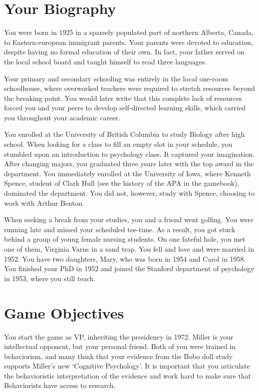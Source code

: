 \begin{refsection}
\section{Your Biography}
\label{yourbiography}

You were born in 1925 in a sparsely populated part of northern Alberta, Canada, to Eastern-european immigrant parents. Your parents were devoted to education, despite having no formal education of their own. In fact, your father served on the local school board and taught himself to read three languages.

Your primary and secondary schooling was entirely in the local one-room schoolhouse, where overworked teachers were required to stretch resources beyond the breaking point. You would later write that this complete lack of resources forced you and your peers to develop self-directed learning skills, which carried you throughout your academic career.

You enrolled at the University of British Columbia to study Biology after high school. When looking for a class to fill an empty slot in your schedule, you stumbled upon an introduction to psychology class. It captured your imagination. After changing majors, you graduated three years later with the top award in the department. You immediately enrolled at the University of Iowa, where Kenneth Spence, student of Clark Hull (see the history of the APA in the gamebook), dominated the department. You did not, however, study with Spence, choosing to work with Arthur Benton.

When seeking a break from your studies, you and a friend went golfing. You were running late and missed your scheduled tee-time. As a result, you got stuck behind a group of young female nursing students. On one fateful hole, you met one of them, Virginia Varns in a sand trap. You fell and love and were married in 1952. You have two daughters, Mary, who was born in 1954 and Carol in 1958.
 
You finished your PhD in 1952 and joined the Stanford department of psychology in 1953, where you still teach.

\section{Game Objectives}
\label{gameobjectives}

You start the game as VP, inheriting the presidency in 1972. Miller is your intellectual opponent, but your personal friend. Both of you were trained in behaviorism, and many think that your evidence from the Bobo doll study supports Miller's new `Cognitive Psychology'. It is important that you articulate the behavioristic interpretation of the evidence and work hard to make sure that Behaviorists have access to research.


\end{refsection}
